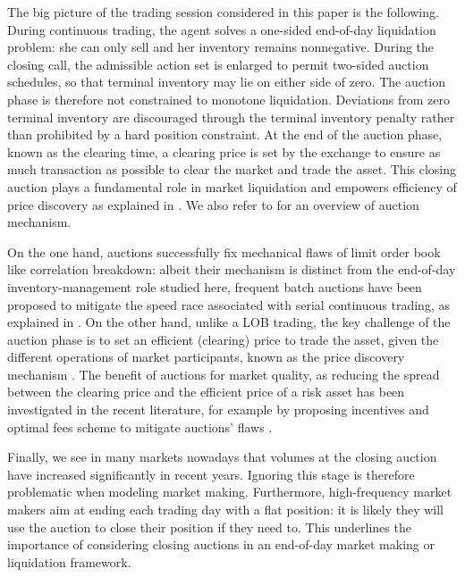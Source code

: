 \documentclass[11pt]{article}
\begin{document}
The big picture of the trading session considered in this paper is the following. During continuous trading, the agent solves a one-sided end-of-day liquidation problem: she can only sell and her inventory remains nonnegative. During the closing call, the admissible action set is enlarged to permit two-sided auction schedules, so that terminal inventory may lie on either side of zero. The auction phase is therefore not constrained to monotone liquidation. Deviations from zero terminal inventory are discouraged through the terminal inventory penalty rather than prohibited by a hard position constraint. At the end of the auction phase, known as the clearing time, a clearing price is set by the exchange to ensure as much transaction as possible to clear the market and trade the asset. This closing auction plays a fundamental role in market liquidation and empowers efficiency of price discovery as explained in \cite{kandel2012effect,raillon2020growing}. We also refer to \cite{milgrom2019auction} for an overview of auction mechanism.\vspace{0.5em}

On the one hand, auctions successfully fix mechanical flaws of limit order book like correlation breakdown: albeit their mechanism is distinct from the end-of-day inventory-management role studied here, frequent batch auctions have been proposed to mitigate the speed race associated with serial continuous trading, as explained in \cite{budish2014implementation}. On the other hand, unlike a LOB trading, the key challenge of the auction phase is to set an efficient (clearing) price to trade the asset, given the different operations of market participants, known as the price discovery mechanism \cite{madhavan2000price,biais2002ipo,biais1999price}. The benefit of auctions for market quality, as reducing the spread between the clearing price and the efficient price of a risk asset has been investigated in the recent literature, for example \cite{du2014welfare,paul2021optimal,derchu2024ahead,salek2024equity,jantschgi2024transaction} by proposing incentives and optimal fees scheme to mitigate auctions' flaws \cite{mastrolia2024clearing,mastrolia2025optimal}.\vspace{0.5em}

Finally, we see in many markets nowadays that volumes at the closing auction have increased significantly in recent years. Ignoring this stage is therefore problematic when modeling market making. Furthermore, high-frequency market makers aim at ending each trading day with a flat position: it is likely they will use the auction to close their position if they need to. This underlines the importance of considering closing auctions in an end-of-day market making or liquidation framework.
\end{document}
